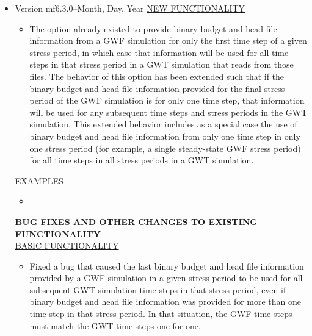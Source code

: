 \documentclass[11pt,twoside,twocolumn]{usgsreport}
\begin{document}
\begin{itemize}
	\item Version mf6.3.0--Month, Day, Year
	\underline{NEW FUNCTIONALITY}
	\begin{itemize}
	        \item The option already existed to provide binary budget and head file information from a GWF simulation for only the first time step of a given stress period, in which case that information will be used for all time steps in that stress period in a GWT simulation that reads from those files. The behavior of this option has been extended such that if the binary budget and head file information provided for the final stress period of the GWF simulation is for only one time step, that information will be used for any subsequent time steps and stress periods in the GWT simulation. This extended behavior includes as a special case the use of binary budget and head file information from only one time step in only one stress period (for example, a single steady-state GWF stress period) for all time steps in all stress periods in a GWT simulation.
	\end{itemize}
	
	\underline{EXAMPLES}
	\begin{itemize}
	        \item --
	\end{itemize}

	\textbf{\underline{BUG FIXES AND OTHER CHANGES TO EXISTING FUNCTIONALITY}} \\
	\underline{BASIC FUNCTIONALITY}
	\begin{itemize}
	        \item Fixed a bug that caused the last binary budget and head file information provided by a GWF simulation in a given stress period to be used for all subsequent GWT simulation time steps in that stress period, even if binary budget and head file information was provided for more than one time step in that stress period. In that situation, the GWF time steps must match the GWT time steps one-for-one.
	\end{itemize}


\end{itemize}
\end{document}
